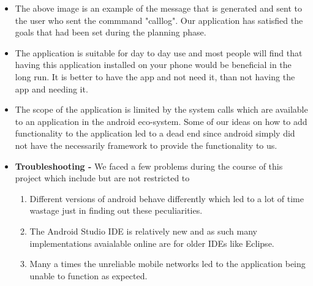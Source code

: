\begin{itemize}
	\item The above image is an example of the message that is generated and sent to the user who sent the commmand "calllog". Our application has satisfied the goals that had been set during the planning phase.
	
	\item The application is suitable for day to day use and most people will find that having this application installed on your phone would be beneficial in the long run. It is better to have the app and not need it, than not having the app and needing it. 
	\item The scope of the application is limited by the system calls which are available to an application in the android eco-system. Some of our ideas on how to add functionality to the application led to a dead end since android simply did not have the necessarily framework to provide the functionality to us.
	
	\item \textbf{Troubleshooting - } We faced a few problems during the course of this project which include but are not restricted to 
		\begin{enumerate}
			\item Different versions of android behave differently which led to a lot of time wastage just in finding out these peculiarities.
			\item The Android Studio IDE is relatively new and as such many implementations avaialable online are for older IDEs like Eclipse.
			\item Many a times the unreliable mobile networks led to the application being unable to function as expected.
			
		\end{enumerate}
	
\end{itemize}

